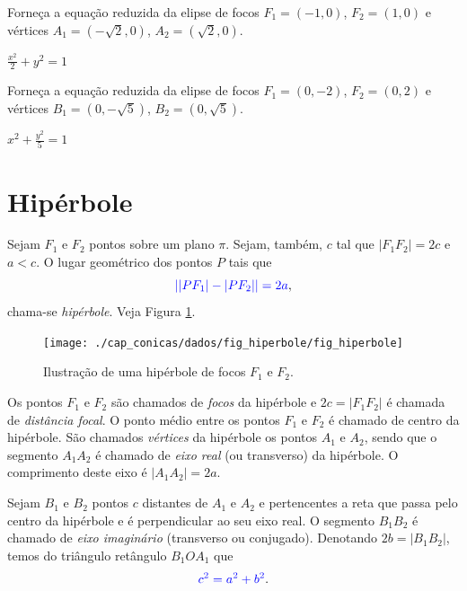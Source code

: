 \begin{exer}
  Forneça a equação reduzida da elipse de focos $F_1=(-1, 0)$, $F_2=(1, 0)$ e vértices $A_1=(-\sqrt{2}, 0)$, $A_2=(\sqrt{2}, 0)$.
\end{exer}
\begin{resp}
  $\displaystyle\frac{x^2}{2}+y^2=1$
\end{resp}

\begin{exer}
  Forneça a equação reduzida da elipse de focos $F_1=(0, -2)$, $F_2=(0, 2)$ e vértices $B_1=(0, -\sqrt{5})$, $B_2=(0, \sqrt{5})$.
\end{exer}
\begin{resp}
  $\displaystyle x^2+\frac{y^2}{5}=1$
\end{resp}

\section{Hipérbole}\label{cap_conicas_sec_hiperbole}

Sejam $F_1$ e $F_2$ pontos sobre um plano $\pi$. Sejam, também, $c$ tal que $|F_1F_2|=2c$ e $a<c$. O lugar geométrico dos pontos $P$ tais que
\begin{equation}
  {\color{blue}||PF_1|-|PF_2||=2a},
\end{equation}
chama-se \emph{hipérbole}. Veja Figura \ref{fig:hiperbole}.

\begin{figure}[H]
  \centering
  \texttt{[image: ./cap\_conicas/dados/fig\_hiperbole/fig\_hiperbole]}
  \caption{Ilustração de uma hipérbole de focos $F_1$ e $F_2$.}
  \label{fig:hiperbole}
\end{figure}

Os pontos $F_1$ e $F_2$ são chamados de \emph{focos} da hipérbole e $2c = |F_1F_2|$ é chamada de \emph{distância focal}. O ponto médio entre os pontos $F_1$ e $F_2$ é chamado de centro da hipérbole. São chamados \emph{vértices} da hipérbole os pontos $A_1$ e $A_2$, sendo que o segmento $A_1A_2$ é chamado de \emph{eixo real} (ou transverso) da hipérbole. O comprimento deste eixo é $|A_1A_2|=2a$.

Sejam $B_1$ e $B_2$ pontos $c$ distantes de $A_1$ e $A_2$ e pertencentes a reta que passa pelo centro da hipérbole e é perpendicular ao seu eixo real. O segmento $B_1B_2$ é chamado de \emph{eixo imaginário} (transverso ou conjugado). Denotando $2b=|B_1B_2|$, temos do triângulo retângulo $B_1OA_1$ que
\begin{equation}
  {\color{blue}c^2 = a^2 + b^2}.
\end{equation}

